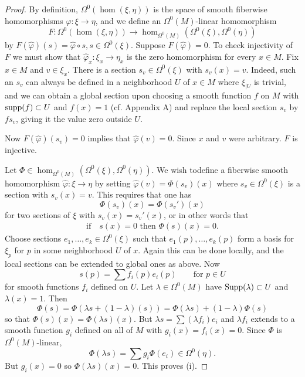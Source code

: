 \begin{proof}
  By definition, $\Omega^0(\hom(\xi, \eta))$ is the space of smooth fiberwise homomorphisms $\hat{\varphi}:\xi\to\eta$,
  and we define an $\Omega^0(M)$-linear homomorphism
  \[
    F:\Omega^0(\hom(\xi, \eta))\to \hom_{\Omega^0(M)}(\Omega^0(\xi), \Omega^0(\eta))
  \]
  by $F(\hat{\varphi})(s)=\hat{\varphi}\circ s, s\in \Omega^0(\xi)$. Suppose $F(\hat\varphi) = 0$. 
  To check injectivity of $F$ we must show that $\hat\varphi_x:\xi_x\to\eta_x$ is the zero homomorphism for every $x\in M$.
  Fix $x\in M$ and $v\in\xi_x$. There is a section $s_v\in\Omega^0(\xi)$ with $s_v(x) = v$. Indeed,
  such an $s_v$ can always be defined in a neighborhood $U$ of $x\in M$ where $\xi_{|U}$ is
  trivial, and we can obtain a global section upon choosing a smooth function $f$ on $M$ with $\operatorname{supp}(f)\subset U$ 
  and $f(x) = 1$ (cf. Appendix A) and replace the local section $s_v$ by $fs_v$, giving it the value zero outside $U$.

  Now $F(\hat\varphi)(s_v)=0$ implies that $\hat\varphi(v)=0$. Since $x$ and $v$ were arbitrary. $F$ is injective.

  Let $\Phi\in\hom_{\Omega^0(M)}(\Omega^0(\xi), \Omega^0(\eta))$. We wish todefine a fiberwise smooth homomorphism 
  $\hat\varphi:\xi\to \eta$ by setting $\hat\varphi(v)=\Phi(s_v)(x)$ where $s_v\in\Omega^0(\xi)$ is a section with $s_v(x)=v$. 
  This requires that one has
  \[
    \Phi(s_v)(x) = \Phi(s_v')(x)
  \]
  for two sections of $\xi$ with $s_v(x)=s_v'(x)$, or in other words that 
  \begin{align}\label{eq:16-13}
    \text{if}\quad s(x) = 0 \text{ then } \Phi(s)(x) = 0.
  \end{align}
  Choose sections $e_1, \ldots, e_k\in\Omega^0(\xi)$ such that $e_1(p), \ldots, e_k(p)$ form a basis for 
  $\xi_p$ for $p$ in some neighborhood $U$ of $x$. Again this can be done locally, and the local sections can be extended
  to global ones as above. Now
  \[
    s(p) = \sum f_i(p)e_i(p)\qquad \text{for } p\in U
  \]
  for smooth functions $f_i$ defined on $U$. Let $\lambda\in\Omega^0(M)$ have $\mathrm{Supp}(\lambda)\subset U$ 
  and $\lambda(x)=1$. Then 
  \[
    \Phi(s) = \Phi(\lambda s + (1-\lambda)(s))
    = \Phi(\lambda s) + (1-\lambda)\Phi(s)
  \]
  so that $\Phi(s)(x) = \Phi(\lambda s)(x)$. But $\lambda s=\sum (\lambda f_i)e_i$ and $\lambda f_i$ extends to a smooth 
  function $g_i$ defined on all of $M$ with $g_i(x) = f_i(x)=0$. Since $\Phi$ is $\Omega^0(M)$-linear,
  \[
    \Phi(\lambda s) = \sum g_i\Phi(e_i)\in \Omega^0(\eta).
  \]
  But $g_i(x)=0$ so $\Phi(\lambda s)(x) = 0$. This proves (i).


\end{proof}
